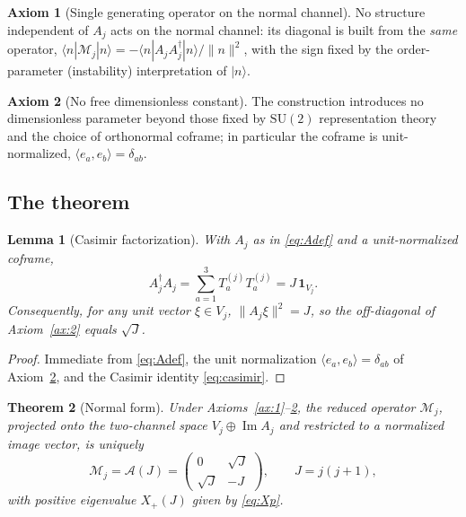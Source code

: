 \documentclass[11pt]{article}
\theoremstyle{plain}
\newtheorem{theorem}{Theorem}[section]
\newtheorem{lemma}[theorem]{Lemma}
\theoremstyle{definition}
\newtheorem{axiom}{Axiom}
\newcommand{\cA}{\mathcal{A}}
\newcommand{\cM}{\mathcal{M}}
\newcommand{\Xp}{X_{+}}
\newcommand{\SU}{\mathrm{SU}}
\begin{document}
\begin{axiom}[Single generating operator on the normal channel]
\label{ax:3}
No structure independent of $A_j$ acts on the normal channel: its diagonal
is built from the \emph{same} operator, $\langle n|\cM_j|n\rangle=
-\langle n|A_jA_j^{\dagger}|n\rangle/\|n\|^2$, with the sign fixed by the
order-parameter (instability) interpretation of $|n\rangle$.
\end{axiom}

\begin{axiom}[No free dimensionless constant]
\label{ax:4}
The construction introduces no dimensionless parameter beyond those fixed
by $\SU(2)$ representation theory and the choice of orthonormal coframe;
in particular the coframe is unit-normalized,
$\langle e_a,e_b\rangle=\delta_{ab}$.
\end{axiom}

\subsection{The theorem}

\begin{lemma}[Casimir factorization]
\label{lem:cas}
With $A_j$ as in \eqref{eq:Adef} and a unit-normalized coframe,
\begin{equation}
A_j^{\dagger}A_j=\sum_{a=1}^{3}T_a^{(j)}T_a^{(j)}=J\,\bm1_{V_j}.
\end{equation}
Consequently, for any unit vector $\xi\in V_j$, $\|A_j\xi\|^2=J$, so the
off-diagonal of Axiom~\ref{ax:2} equals $\sqrt J$.
\end{lemma}

\begin{proof}
Immediate from \eqref{eq:Adef}, the unit normalization
$\langle e_a,e_b\rangle=\delta_{ab}$ of Axiom~\ref{ax:4}, and the Casimir
identity \eqref{eq:casimir}.
\end{proof}

\begin{theorem}[Normal form]
\label{thm:normalform}
Under Axioms~\ref{ax:1}--\ref{ax:4}, the reduced operator $\cM_j$,
projected onto the two-channel space $V_j\oplus\operatorname{Im}A_j$ and
restricted to a normalized image vector, is uniquely
\begin{equation}
\cM_j=\cA(J)=
\begin{pmatrix}0&\sqrt J\\ \sqrt J&-J\end{pmatrix},
\qquad J=j(j+1),
\end{equation}
with positive eigenvalue $\Xp(J)$ given by \eqref{eq:Xp}.
\end{theorem}
\end{document}
